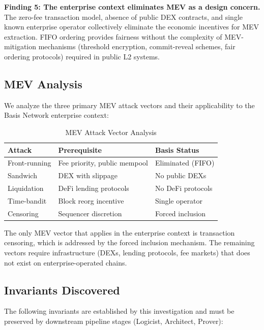 \textbf{Finding 5: The enterprise context eliminates MEV as a design concern.}
The zero-fee transaction model, absence of public DEX contracts, and single known
enterprise operator collectively eliminate the economic incentives for MEV extraction.
FIFO ordering provides fairness without the complexity of MEV-mitigation mechanisms
(threshold encryption, commit-reveal schemes, fair ordering protocols) required in
public L2 systems.

\subsection{MEV Analysis}

We analyze the three primary MEV attack vectors and their applicability to the Basis
Network enterprise context:

\begin{table}[htbp]
\caption{MEV Attack Vector Analysis}
\label{tab:mev-analysis}
\centering
\begin{tabular}{lll}
\toprule
\textbf{Attack} & \textbf{Prerequisite} & \textbf{Basis Status} \\
\midrule
Front-running & Fee priority, public mempool & Eliminated (FIFO) \\
Sandwich & DEX with slippage & No public DEXs \\
Liquidation & DeFi lending protocols & No DeFi protocols \\
Time-bandit & Block reorg incentive & Single operator \\
Censoring & Sequencer discretion & Forced inclusion \\
\bottomrule
\end{tabular}
\end{table}

The only MEV vector that applies in the enterprise context is transaction censoring,
which is addressed by the forced inclusion mechanism. The remaining vectors require
infrastructure (DEXs, lending protocols, fee markets) that does not exist on
enterprise-operated chains.

\subsection{Invariants Discovered}

The following invariants are established by this investigation and must be preserved
by downstream pipeline stages (Logicist, Architect, Prover):

